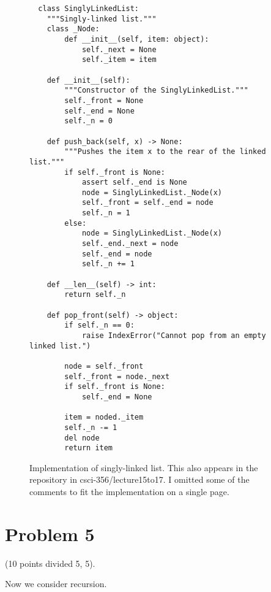 \documentclass{article}
\begin{document}
\begin{enumerate}[label=(\alph*)]
\begin{figure}
\begin{verbatim}
  class SinglyLinkedList:
    """Singly-linked list."""
    class _Node:
        def __init__(self, item: object):
            self._next = None
            self._item = item
     
    def __init__(self):
        """Constructor of the SinglyLinkedList."""
        self._front = None
        self._end = None
        self._n = 0

    def push_back(self, x) -> None:
        """Pushes the item x to the rear of the linked list."""
        if self._front is None:
            assert self._end is None
            node = SinglyLinkedList._Node(x)
            self._front = self._end = node
            self._n = 1
        else:
            node = SinglyLinkedList._Node(x)
            self._end._next = node
            self._end = node
            self._n += 1

    def __len__(self) -> int:
        return self._n

    def pop_front(self) -> object:
        if self._n == 0:
            raise IndexError("Cannot pop from an empty linked list.")

        node = self._front
        self._front = node._next
        if self._front is None:
            self._end = None

        item = noded._item
        self._n -= 1
        del node
        return item
\end{verbatim}
\caption{Implementation of singly-linked list. This also appears in
  the repository in csci-356/lecture15to17. I omitted some of the comments
  to fit the implementation on a single page.}\label{fig:sll}

\end{figure}
\end{enumerate}

\section{Problem 5}

(10 points divided 5, 5).

Now we consider recursion.
\end{document}

